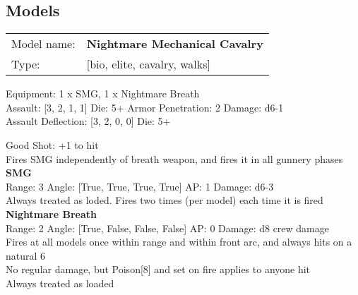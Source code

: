 \clearpage

\subsection{ Models }

\begin{tabular}{ll}
Model name: & {\bf Nightmare Mechanical Cavalry } \\
Type: & [bio, elite, cavalry, walks] \\
\end{tabular}

Equipment: 1 x SMG, 1 x Nightmare Breath \\

Assault: [3, 2, 1, 1] Die: 5+ Armor Penetration: 2 Damage: d6-1 \\
Assault Deflection: [3, 2, 0, 0] Die: 5+\\
\indent  

Good Shot: +1 to hit\\ 
Fires SMG independently of breath weapon, and fires it in all gunnery phases\\ 


{\bf SMG } \\



Range: 3  Angle: [True, True, True, True] AP: 1 Damage: d6-3 \\
Always treated as loded. Fires two times (per model) each time it is fired\\ 




{\bf Nightmare Breath } \\



Range: 2  Angle: [True, False, False, False] AP: 0 Damage: d8 crew damage \\
Fires at all models once within range and within front arc, and always hits on a natural 6\\ 
No regular damage, but Poison[8] and set on fire applies to anyone hit\\ 
Always treated as loaded\\ 




 















